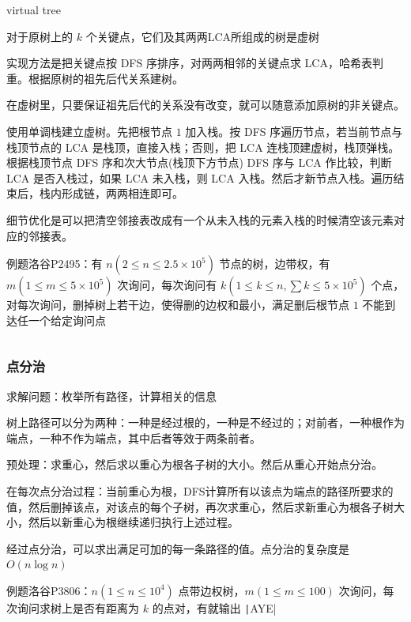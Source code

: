 \documentclass[twocolumn,10pt]{ctexart}
\begin{document}
virtual tree

对于原树上的 $k$ 个关键点，它们及其两两LCA所组成的树是虚树

实现方法是把关键点按 DFS 序排序，对两两相邻的关键点求 LCA，哈希表判重。根据原树的祖先后代关系建树。

在虚树里，只要保证祖先后代的关系没有改变，就可以随意添加原树的非关键点。

使用单调栈建立虚树。先把根节点 $1$ 加入栈。按 DFS 序遍历节点，若当前节点与栈顶节点的 LCA 是栈顶，直接入栈；否则，把 LCA 连栈顶建虚树，栈顶弹栈。根据栈顶节点 DFS 序和次大节点(栈顶下方节点) DFS 序与 LCA 作比较，判断 LCA 是否入栈过，如果 LCA 未入栈，则 LCA 入栈。然后才新节点入栈。遍历结束后，栈内形成链，两两相连即可。

细节优化是可以把清空邻接表改成有一个从未入栈的元素入栈的时候清空该元素对应的邻接表。

\begin{notebox}
例题洛谷P2495：有 $n(2\le n\le2.5\times10^5)$ 节点的树，边带权，有 $m(1\le m\le5\times10^5)$ 次询问，每次询问有 $k(1\le k\le n,\allowbreak{}\sum k\le5\times10^5)$ 个点，对每次询问，删掉树上若干边，使得删的边权和最小，满足删后根节点 $1$ 不能到达任一个给定询问点
\end{notebox}

\inputminted{cpp}{code/p2495_virtual_tree.cpp}

\subsubsection{点分治}

求解问题：枚举所有路径，计算相关的信息

树上路径可以分为两种：一种是经过根的，一种是不经过的；对前者，一种根作为端点，一种不作为端点，其中后者等效于两条前者。

预处理：求重心，然后求以重心为根各子树的大小。然后从重心开始点分治。

在每次点分治过程：当前重心为根，DFS计算所有以该点为端点的路径所要求的值，然后删掉该点，对该点的每个子树，再次求重心，然后求新重心为根各子树大小，然后以新重心为根继续递归执行上述过程。

经过点分治，可以求出满足可加的每一条路径的值。点分治的复杂度是 $O(n\log n)$

\begin{notebox}
例题洛谷P3806：$n(1\le n\le10^4)$ 点带边权树，$m(1\le m\le100)$ 次询问，每次询问求树上是否有距离为 $k$ 的点对，有就输出 \texttt|AYE|
\end{notebox}
\end{document}
